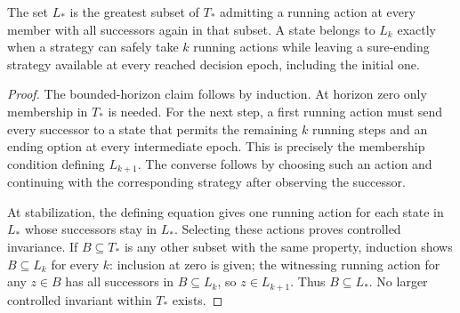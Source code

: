 \begin{lemma}\label{r:running-invariant}
The set $L_*$ is the greatest subset of $T_*$ admitting a running action at every member with all successors again in that subset. A state belongs to $L_k$ exactly when a strategy can safely take $k$ running actions while leaving a sure-ending strategy available at every reached decision epoch, including the initial one.
\end{lemma}
\begin{proof}
The bounded-horizon claim follows by induction. At horizon zero only membership in $T_*$ is needed. For the next step, a first running action must send every successor to a state that permits the remaining $k$ running steps and an ending option at every intermediate epoch. This is precisely the membership condition defining $L_{k+1}$. The converse follows by choosing such an action and continuing with the corresponding strategy after observing the successor.

At stabilization, the defining equation gives one running action for each state in $L_*$ whose successors stay in $L_*$. Selecting these actions proves controlled invariance. If $B\subseteq T_*$ is any other subset with the same property, induction shows $B\subseteq L_k$ for every $k$: inclusion at zero is given; the witnessing running action for any $z\in B$ has all successors in $B\subseteq L_k$, so $z\in L_{k+1}$. Thus $B\subseteq L_*$. No larger controlled invariant within $T_*$ exists.
\end{proof}

